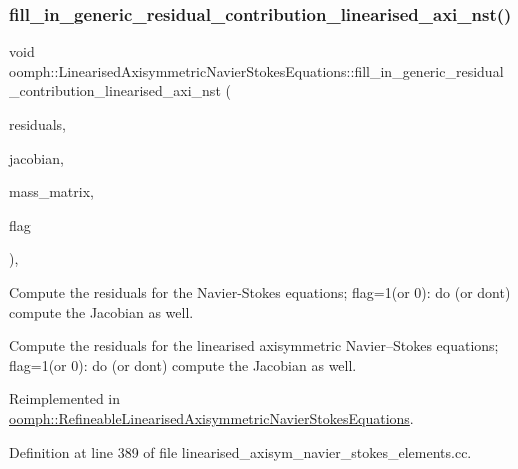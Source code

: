 \subsubsection{\texorpdfstring{fill\+\_\+in\+\_\+generic\+\_\+residual\+\_\+contribution\+\_\+linearised\+\_\+axi\+\_\+nst()}{fill\_in\_generic\_residual\_contribution\_linearised\_axi\_nst()}}
{\footnotesize\ttfamily void oomph\+::\+Linearised\+Axisymmetric\+Navier\+Stokes\+Equations\+::fill\+\_\+in\+\_\+generic\+\_\+residual\+\_\+contribution\+\_\+linearised\+\_\+axi\+\_\+nst (\begin{DoxyParamCaption}\item[{\hyperlink{classoomph_1_1Vector}{Vector}$<$ double $>$ \&}]{residuals,  }\item[{\hyperlink{classoomph_1_1DenseMatrix}{Dense\+Matrix}$<$ double $>$ \&}]{jacobian,  }\item[{\hyperlink{classoomph_1_1DenseMatrix}{Dense\+Matrix}$<$ double $>$ \&}]{mass\+\_\+matrix,  }\item[{unsigned}]{flag }\end{DoxyParamCaption})\hspace{0.3cm}{\ttfamily [protected]}, {\ttfamily [virtual]}}



Compute the residuals for the Navier-\/\+Stokes equations; flag=1(or 0)\+: do (or don\textquotesingle{}t) compute the Jacobian as well. 

Compute the residuals for the linearised axisymmetric Navier--Stokes equations; flag=1(or 0)\+: do (or don\textquotesingle{}t) compute the Jacobian as well. 

Reimplemented in \hyperlink{classoomph_1_1RefineableLinearisedAxisymmetricNavierStokesEquations_a5f8f964976bf7460c41360ceab7b0f18}{oomph\+::\+Refineable\+Linearised\+Axisymmetric\+Navier\+Stokes\+Equations}.



Definition at line 389 of file linearised\+\_\+axisym\+\_\+navier\+\_\+stokes\+\_\+elements.\+cc.




